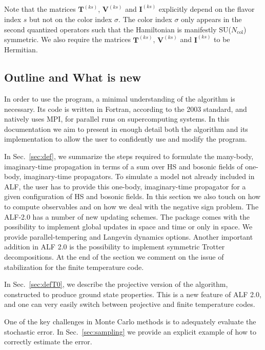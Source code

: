 Note that the matrices  $\bm{T}^{(ks)}$,  $\bm{V}^{(ks)}$ and  $\bm{I}^{(ks)}$ explicitly depend on the flavor index $s$ but not on the color index $\sigma$. 
The color index $\sigma$ only appears in  the  second quantized operators such that the Hamiltonian is manifestly SU($N_{\mathrm{col}}$)  symmetric.  We also require
the matrices $\bm{T}^{(ks)}$,  $\bm{V}^{(ks)}$ and  $\bm{I}^{(ks)}$  to be  Hermitian. 

\subsection{Outline and What is new}


In order to use the program, a minimal understanding of the algorithm is necessary. 
Its code is written in Fortran, according to the 2003 standard, and natively uses MPI, for parallel runs on supercomputing systems.
In this documentation we aim to present in enough detail both the algorithm and its implementation to allow the user to confidently use and modify the program.

In Sec.~\ref{sec:def}, we summarize the steps required to formulate the many-body, imaginary-time propagation in terms of a sum over HS and bosonic fields of one-body, imaginary-time propagators.   
To simulate a model not already included in ALF, the user has to provide this one-body, imaginary-time propagator for a given configuration of HS and bosonic fields.  In this section we also  touch on how to compute observables and on  how we deal with the negative sign problem.  The ALF-2.0  has a number  of new updating schemes.   The package comes with  the possibility to  implement global updates in space and time or only in space. We provide parallel-tempering  and Langevin dynamics options.   Another important addition in ALF 2.0  is the possibility to implement symmetric Trotter decompositions.    At the end of the section   we  comment  on the issue of stabilization for the finite temperature code. 

In Sec.~\ref{sec:defT0},    we describe the projective version of the algorithm, constructed to produce ground state properties. This is a new feature of ALF 2.0, and  one can very easily switch between  projective and finite temperature codes. 

One of the key challenges in  Monte Carlo methods is to  adequately evaluate the stochastic error.  In Sec.~\ref{sec:sampling}  we provide an explicit example  of how to correctly estimate the   error. 

